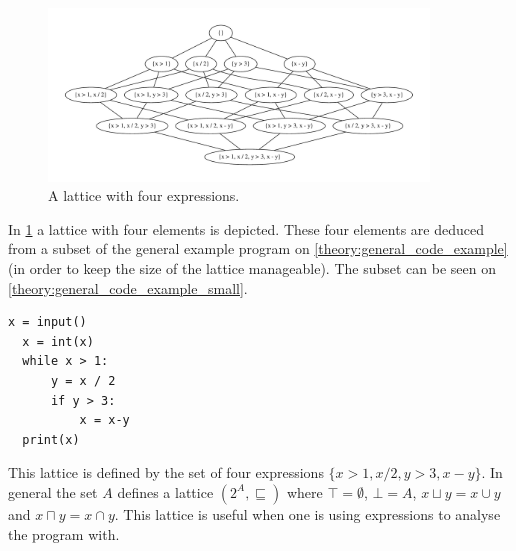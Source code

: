 \begin{figure}
\begin{center}
\includegraphics[width=0.9\textwidth]{figures/dot_files/lattice_example.pdf}
\end{center}
\caption{A lattice with four expressions.}
\label{lattice_example}
\end{figure}

In \cref{lattice_example} a lattice with four elements is depicted.
These four elements are deduced from a subset of the general example program on \cref{theory:general_code_example}(in order to keep the size of the lattice manageable).
The subset can be seen on \cref{theory:general_code_example_small}.

\begin{lstlisting}[style=python, caption={The general code example used throughout the theory chapter.}, label={theory:general_code_example_small}]
  x = input()
  x = int(x)
  while x > 1:
      y = x / 2
      if y > 3:
          x = x-y
  print(x)
\end{lstlisting}

This lattice is defined by the set of four expressions $\{x > 1, x / 2, y > 3, x - y \}$.
In general the set $A$ defines a lattice $(2^A, \sqsubseteq )$ where $\top = \emptyset$, $\bot = A$, $x\sqcup y = x \cup y$ and $x \sqcap y = x \cap y$.
This lattice is useful when one is using expressions to analyse the program with.

